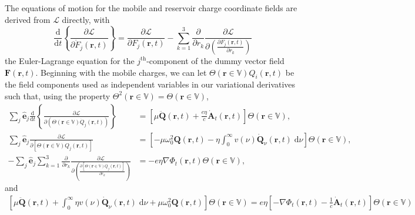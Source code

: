 \documentclass{article}
\begin{document}
The equations of motion for the mobile and reservoir charge coordinate fields are derived from $\mathcal{L}$ directly, with
\begin{equation}
\frac{\mathrm{d}}{\mathrm{d}t}\left\{\frac{\partial \mathcal{L}}{\partial \dot{F}_j(\mathbf{r},t)}\right\} = \frac{\partial \mathcal{L}}{\partial F_j(\mathbf{r},t)} - \sum_{k = 1}^3\frac{\partial}{\partial r_k}\frac{\partial \mathcal{L}}{\partial\!\left(\frac{\partial F_j(\mathbf{r},t)}{\partial r_k}\right)}
\end{equation}
the Euler-Lagrange equation for the $j^\mathrm{th}$-component of the dummy vector field $\mathbf{F}(\mathbf{r},t)$. Beginning with the mobile charges, we can let $\Theta(\mathbf{r}\in\mathbb{V})Q_i(\mathbf{r},t)$ be the field components used as independent variables in our variational derivatives such that, using the property $\Theta^2(\mathbf{r}\in\mathbb{V}) = \Theta(\mathbf{r}\in\mathbb{V})$,
\begin{equation}
\begin{split}
\sum_j\hat{\mathbf{e}}_j\frac{\mathrm{d}}{\mathrm{d}t}\left\{\frac{\partial \mathcal{L}}{\partial\left(\Theta(\mathbf{r}\in\mathbb{V})\dot{Q}_{j}(\mathbf{r},t)\right)}\right\} &= \left[\mu\ddot{\mathbf{Q}}(\mathbf{r},t) + \frac{e\eta}{c}\dot{\mathbf{A}}_t(\mathbf{r},t)\right]\Theta(\mathbf{r}\in\mathbb{V}),\\
\sum_j\hat{\mathbf{e}}_j\frac{\partial \mathcal{L}}{\partial \left[\Theta(\mathbf{r}\in\mathbb{V})Q_{j}(\mathbf{r},t)\right]} &= \left[-\mu\omega_0^2\mathbf{Q}(\mathbf{r},t)
- \eta\int_0^\infty v(\nu)\dot{\mathbf{Q}}_\nu(\mathbf{r},t)\;\mathrm{d}\nu\right]\Theta(\mathbf{r}\in\mathbb{V}),\\
-\sum_j\hat{\mathbf{e}}_j\sum_{k = 1}^3\frac{\partial}{\partial r_k}\frac{\partial \mathcal{L}}{\partial\!\left(\frac{\partial \left[\Theta(\mathbf{r}\in\mathbb{V})Q_{j}(\mathbf{r},t)\right]}{\partial r_k}\right)} &= -e\eta\nabla\Phi_t(\mathbf{r},t)\Theta(\mathbf{r}\in\mathbb{V}),
\end{split}
\end{equation}
and
\begin{equation}\label{eq:eqOfMotionQm}
\begin{split}
\left[\mu\ddot{\mathbf{Q}}(\mathbf{r},t) + \int_0^\infty \eta v(\nu)\dot{\mathbf{Q}}_\nu(\mathbf{r},t)\;\mathrm{d}\nu + \mu\omega_0^2\mathbf{Q}(\mathbf{r},t)\right]\Theta(\mathbf{r}\in\mathbb{V}) = e\eta\left[-\nabla\Phi_t(\mathbf{r},t) - \frac{1}{c}\dot{\mathbf{A}}_t(\mathbf{r},t)\right]\Theta(\mathbf{r}\in\mathbb{V})
\end{split}
\end{equation}
\end{document}
